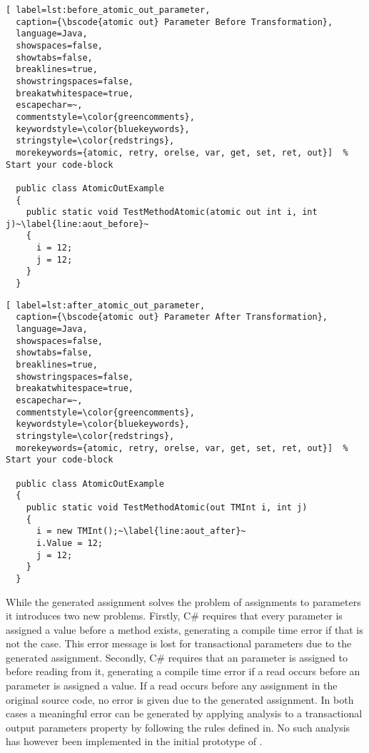 \begin{lstlisting}[ label=lst:before_atomic_out_parameter,
  caption={\bscode{atomic out} Parameter Before Transformation},
  language=Java,  
  showspaces=false,
  showtabs=false,
  breaklines=true,
  showstringspaces=false,
  breakatwhitespace=true,
  escapechar=~,
  commentstyle=\color{greencomments},
  keywordstyle=\color{bluekeywords},
  stringstyle=\color{redstrings},
  morekeywords={atomic, retry, orelse, var, get, set, ret, out}]  % Start your code-block

  public class AtomicOutExample
  {
    public static void TestMethodAtomic(atomic out int i, int j)~\label{line:aout_before}~
    {
      i = 12;
      j = 12;
    }
  }
\end{lstlisting}

\begin{lstlisting}[ label=lst:after_atomic_out_parameter,
  caption={\bscode{atomic out} Parameter After Transformation},
  language=Java,  
  showspaces=false,
  showtabs=false,
  breaklines=true,
  showstringspaces=false,
  breakatwhitespace=true,
  escapechar=~,
  commentstyle=\color{greencomments},
  keywordstyle=\color{bluekeywords},
  stringstyle=\color{redstrings},
  morekeywords={atomic, retry, orelse, var, get, set, ret, out}]  % Start your code-block

  public class AtomicOutExample
  {
    public static void TestMethodAtomic(out TMInt i, int j)
    {
      i = new TMInt();~\label{line:aout_after}~
      i.Value = 12;
      j = 12;
    }
  }
\end{lstlisting}

While the generated assignment solves the problem of assignments to  parameters it introduces two new problems. Firstly, C\# requires that every  parameter is assigned a value before a method exists, generating a compile time error if that is not the case\cite[p. 94]{csharp2013specificaiton}. This error message is lost for transactional  parameters due to the generated assignment. Secondly, C\# requires that an  parameter is assigned to before reading from it\cite[p. 94]{csharp2013specificaiton}, generating a compile time error if a read occurs before an  parameter is assigned a value. If a read occurs before any assignment in the original source code, no error is given due to the generated assignment. In both cases a meaningful error can be generated by applying analysis to a transactional output parameters  property by following the rules defined in\cite[p. 95]{csharp2013specificaiton}. No such analysis has however been implemented in the initial prototype of \stmname.

